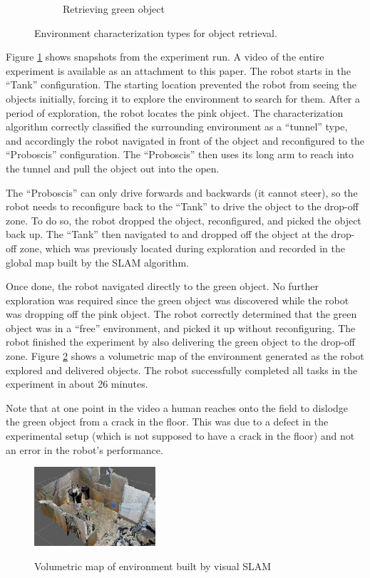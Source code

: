 \documentclass[conference]{IEEEtran}
\begin{document}
\begin{figure}[t]
\begin{subfigure}[t]{0.32\textwidth}
        \caption{Retrieving green object}
    \end{subfigure}
      \caption{Environment characterization types for object retrieval.}
      \label{fig:demo}
   \vspace{-1em}
   \end{figure}
%
Figure \ref{fig:demo} shows snapshots from the experiment run. A video of the entire experiment is available as an attachment to this paper. The robot starts in the ``Tank'' configuration. The starting location prevented the robot from seeing the objects initially, forcing it to explore the environment to search for them. After a period of exploration, the robot locates the pink object. The characterization algorithm correctly classified the surrounding environment as a ``tunnel'' type, and accordingly the robot navigated in front of the object and reconfigured to the ``Proboscis'' configuration. The ``Proboscis'' then uses its long arm to reach into the tunnel and pull the object out into the open.

 The ``Proboscis'' can only drive forwards and backwards (it cannot steer), so the robot needs to reconfigure back to the ``Tank'' to drive the object to the drop-off zone.  To do so, the robot dropped the object,  reconfigured, and picked the object back up. The ``Tank'' then navigated to and dropped off the object at the drop-off zone, which was previously located during exploration and recorded in the global map built by the SLAM algorithm.

 Once done, the robot navigated directly to the green object.  No further exploration was required since the green object was discovered while the robot was dropping off the pink object. The robot correctly determined
that the green object was in a ``free'' environment, and picked it up without reconfiguring. The robot finished the experiment by also delivering the green object to the drop-off zone. Figure \ref{fig:octomap} shows a volumetric map of the environment generated as the robot explored and delivered objects. The robot successfully completed all tasks in the experiment in about 26 minutes. 

Note that at one point in the video a human reaches onto the field to dislodge the green object from a crack in the floor.  This was due to a defect in the experimental setup (which is not supposed to have a crack in the floor) and not an error in the robot's performance.
%
\begin{figure}
\begin{center}
\includegraphics[width=0.4\textwidth]{images/map4.jpg}
\caption{Volumetric map of environment built by visual SLAM}
\vspace{-2em}
\label{fig:octomap}
\end{center}
\end{figure}
\end{document}
